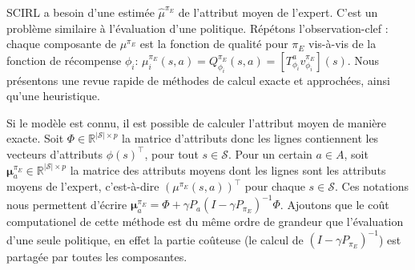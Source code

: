 \documentclass[french,utf8]{./hermes-journal}
\newcommand{\s}{\mathcal{S}}
\newcommand{\A}{\mathcal{A}}
\newcommand{\Mu}{\boldsymbol{\mu}}
\begin{document}
SCIRL a besoin d'une estimée $\hat{\mu}^{\pi_E}$ de l'attribut moyen de l'expert. C'est un problème similaire à l'évaluation d'une politique. Répétons l'observation-clef : chaque composante de 
$\mu^{\pi_E}$ est la fonction de qualité pour $\pi_E$ vis-à-vis de la fonction de récompense $\phi_i$: $\mu_i^{\pi_E}(s,a) = Q^{\pi_E}_{\phi_i}(s,a) =
[T^a_{\phi_i} v^{\pi_E}_{\phi_i}](s)$. Nous présentons une revue rapide de méthodes de calcul exacte et approchées, ainsi qu'une heuristique.

Si le modèle est connu, il est possible de calculer l'attribut moyen de manière exacte. Soit $\Phi\in\mathbb{R}^{|\s|\times p}$ la matrice d'attributs donc les lignes contiennent les vecteurs d'attributs $\phi(s)^\top$, pour tout
$s\in\s$.
%
%
Pour un certain $a\in A$, soit $\Mu^{\pi_E}_a \in\mathbb{R}^{|\s|\times
p}$ la matrice des attributs moyens dont les lignes sont les attributs moyens de l'expert, c'est-à-dire  $(\mu^{\pi_E}(s,a))^\top$ pour chaque $s\in\s$.
Ces notations nous permettent d'écrire $\Mu_a^{\pi_E} = \Phi + \gamma
P_a(I-\gamma P_{\pi_E})^{-1} \Phi$.
Ajoutons que le coût computationel de cette méthode est du même ordre de grandeur que l'évaluation d'une seule politique, en effet la partie coûteuse (le calcul de $(I-\gamma P_{\pi_E})^{-1}$) est partagée par toutes les composantes.
\end{document}
